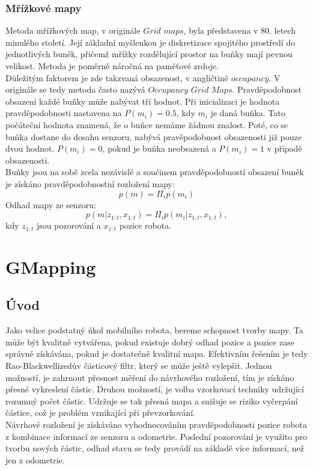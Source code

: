 \documentclass[11pt]{article}
\begin{document}
\subsubsection{Mřížkové mapy}
Metoda mřížkových map, v originále $Grid$ $maps$, byla představena v 80. letech minulého století. Její základní myšlenkou je diskretizace spojitého prostředí do jednotlivých buněk, přičemž mřížky rozdělující prostor na buňky mají pevnou velikost. Metoda je poměrně náročná na paměťové zrdoje.\\
\indent Důležitým faktorem je zde takzvaná obsazenost, v angličtině $occupancy$. V originále se tedy metoda často nazývá $Occupancy$ $Grid$ $Maps$. Pravděpodobnost obsazení každé buňky může nabývat tří hodnot. Při inicializaci je hodnota pravděpodobnosti nastavena na $P(m_i)=0.5$, kdy $m_i$ je daná buňka. Tato počáteční hodnota znamená, že o buňce nemáme žádnou znalost. Poté, co se buňka dostane do dosahu senzoru, nabývá pravěpodobnost obsazenosti již pouze dvou hodnot. $P(m_i)=0$, pokud je buňka neobsazená a $P(m_i)=1$ v případě obsazenosti.\\
\indent Buňky jsou na sobě zcela nezávislé a součinem pravděpodobností obsazení buněk je získáno pravděpodobnostní rozložení mapy:
\begin{equation}
	p(m)=\Pi_ip(m_i)
\end{equation}
Odhad mapy ze senzoru:
\begin{equation}
	p(m|z_{1:t},x_{1:t})=\Pi_ip(m_i|z_{1:t},x_{1:t}),
\end{equation}
kdy $z_{1:t}$ jsou pozorování a $x_{1:t}$ pozice robota.
\newpage

\section{GMapping}

\subsection{Úvod}
Jako velice podstatný úkol mobilního robota, bereme schopnost tvorby mapy. Ta může být kvalitně vytvářena, pokud existuje dobrý odhad pozice a pozice zase správně získávána, pokud je dostatečně kvalitní mapa. Efektivním řešením je tedy Rao-Blackwellizedův částicový filtr, který se může ještě vylepšit. Jednou možností, je zahrnout přesnost měření do návrhového rozložení, tím je získáno přesné vykreslení částic. Druhou možností, je volba vzorkovací techniky udržující rozumný počet částic. Udržuje se tak přesná mapa a snižuje se riziko vyčerpání částice, což je problém vznikající při převzorkování.\\
\indent Návrhové rozložení je získáváno vyhodnocováním pravděpodobnosti pozice robota z kombinace informací ze senzoru a odometrie. Poslední pozorování je využito pro tvorbu nových částic, odhad stavu se tedy provádí na základě více informací, než jen z odometrie. 
\end{document}

